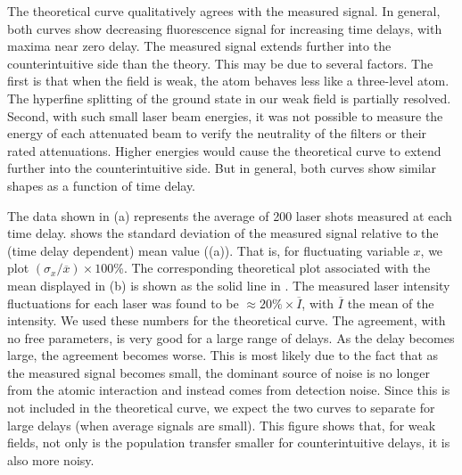 The theoretical curve qualitatively agrees with the measured signal.  In
general, both curves show decreasing fluorescence signal for increasing time
delays, with maxima near zero delay.  The measured signal extends further into
the counterintuitive side than the theory.  This may be due to several factors. 
The first is that when the field is weak, the atom behaves less like a
three-level atom.  The hyperfine splitting of the ground state in our weak field
is partially resolved. Second, with such small laser beam energies, it was not
possible to measure the energy of each attenuated beam to verify the neutrality
of the filters or their rated attenuations.  Higher energies would cause the
theoretical curve to extend further into the counterintuitive side.  But in
general, both curves show similar shapes as a function of time delay.

\begin{figure}[tbp]
\bigskip
{}
\end{figure}

The data shown in (a) represents the average of 200 laser shots
measured at each time delay.   shows the standard deviation
of the measured signal relative to the (time delay dependent) mean
value ((a)).  That is, for fluctuating variable $x$, we plot 
$(\sigma_x/\overline{x})\times 100$\%.  The corresponding theoretical plot
associated with the mean displayed in (b) is shown as the solid
line in .  The measured laser intensity fluctuations for each
laser was found to be $\approx 20\% \times \overline{I}$, with $\overline{I}$
the mean of the intensity.  We used these numbers for the theoretical curve.  The
agreement, with no free parameters, is very good for a large range of delays. 
As the delay becomes large, the agreement becomes worse.  This is most likely
due to the fact that as the measured signal becomes small, the dominant source
of noise is no longer from the atomic interaction and instead comes from
detection noise.  Since this is not included in the theoretical curve, we expect
the two curves to separate for large delays (when average signals are small). 
This figure shows that, for weak fields, not only is the population transfer
smaller for counterintuitive delays, it is also more noisy.

